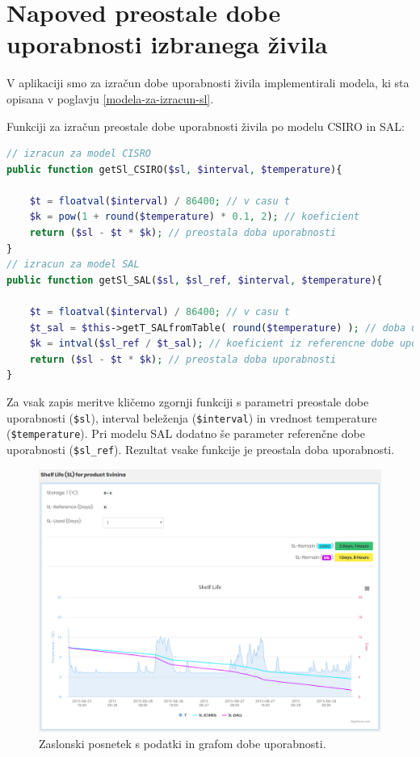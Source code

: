 \documentclass[a4paper, 12pt]{book}
\begin{document}
\section{Napoved preostale dobe uporabnosti izbranega živila}

V aplikaciji smo za izračun dobe uporabnosti živila implementirali modela, ki sta opisana v poglavju \ref{modela-za-izracun-sl}.


Funkciji za izračun preostale dobe uporabnosti živila po modelu CSIRO in SAL:

\begin{lstlisting}[language=PHP, style=mystyle]
// izracun za model CISRO
public function getSl_CSIRO($sl, $interval, $temperature){

    $t = floatval($interval) / 86400; // v casu t
    $k = pow(1 + round($temperature) * 0.1, 2); // koeficient
    return ($sl - $t * $k); // preostala doba uporabnosti
}
// izracun za model SAL
public function getSl_SAL($sl, $sl_ref, $interval, $temperature){

    $t = floatval($interval) / 86400; // v casu t
    $t_sal = $this->getT_SALfromTable( round($temperature) ); // doba uporabnosti pri temperaturi T prebrana iz tabele SAL
    $k = intval($sl_ref / $t_sal); // koeficient iz referencne dobe uporabnosti deljeno z $t_sal
    return ($sl - $t * $k); // preostala doba uporabnosti
}
\end{lstlisting}

Za vsak zapis meritve kličemo zgornji funkciji s parametri preostale dobe uporabnosti (\verb=$sl=), interval beleženja (\verb=$interval=) in vrednost temperature (\verb=$temperature=). Pri modelu SAL dodatno še parameter referenčne dobe uporabnosti (\verb=$sl_ref=). Rezultat vsake funkcije je preostala doba uporabnosti.

\begin{figure}[h]
\begin{center}
\includegraphics[width=\textwidth]{slike/record_page_333.png}
\end{center}
\caption{Zaslonski posnetek s podatki in grafom dobe uporabnosti.}
\label{ss-record-page-sl}
\end{figure}
\end{document}
